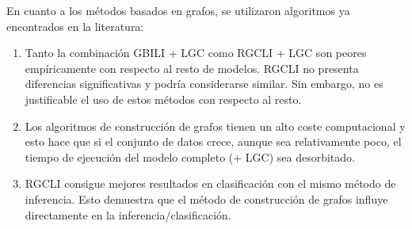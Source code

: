 En cuanto a los métodos basados en grafos, se utilizaron algoritmos ya encontrados en la literatura:

\begin{enumerate}[label=\destacado{\arabic*.}]
  \setlength\itemsep{1em}
  \setcounter{enumi}{8}
  \item Tanto la combinación GBILI + LGC como RGCLI + LGC son peores empíricamente con respecto al resto de modelos. RGCLI no presenta diferencias significativas y podría considerarse similar. Sin embargo, no es justificable el uso de estos métodos con respecto al resto.

  \item Los algoritmos de construcción de grafos tienen un alto coste computacional y esto hace que si el conjunto de datos crece, aunque sea relativamente poco, el tiempo de ejecución del modelo completo (+ LGC) sea desorbitado.
  
  \item RGCLI consigue mejores resultados en clasificación con el mismo método de inferencia. Esto demuestra que el método de construcción de grafos influye directamente en la inferencia/clasificación.
\end{enumerate}
